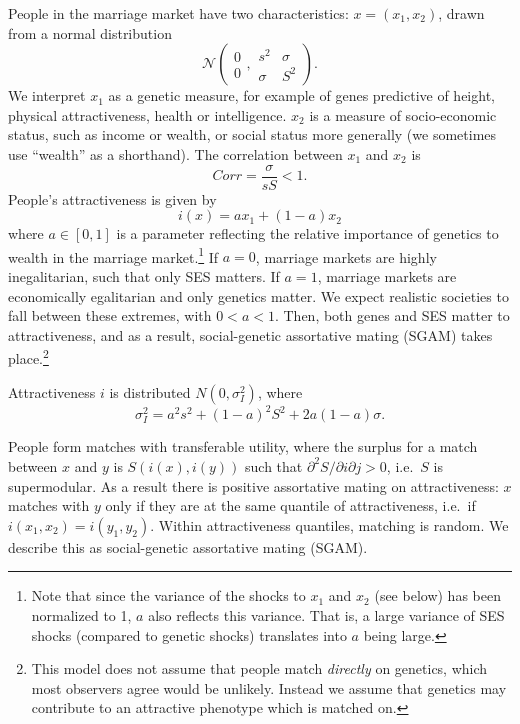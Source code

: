 \documentclass[
  12pt,
]{article}
\theoremstyle{definition}
\theoremstyle{definition}
\theoremstyle{definition}
\theoremstyle{definition}
\theoremstyle{remark}
\begin{document}
People in the marriage market have two characteristics:
\(x=\left( x_{1},x_{2}\right)\), drawn from a normal distribution
\[
\mathcal{N}
\left( 
\begin{array}{c}
0 \\ 
0%
\end{array}%
,%
\begin{array}{cc}
s^{2} & \sigma \\ 
\sigma & S^{2}%
\end{array}%
\right).
\]
We interpret \(x_1\) as a genetic measure, for example of genes predictive of
height, physical attractiveness, health or intelligence. \(x_2\) is a measure of
socio-economic status, such as income or wealth, or social status more generally
(we sometimes use ``wealth'' as a shorthand). The correlation between
\(x_1\) and \(x_2\) is
\[
Corr = \frac{\sigma }{sS} < 1.
\]
People's attractiveness is given by
\[
i\left( x\right) =ax_{1}+\left( 1-a\right) x_{2}
\]
where \(a \in [0, 1]\) is a parameter reflecting the relative importance of
genetics to wealth in the marriage market.\footnote{Note that since the variance of the shocks to \(x_1\) and \(x_2\)
  (see below) has been normalized to 1, \(a\) also reflects this variance. That
  is, a large variance of SES shocks (compared to genetic shocks) translates into
  \(a\) being large.} If \(a = 0\),
marriage markets are highly inegalitarian, such that only SES matters. If \(a = 1\), marriage markets are economically egalitarian and only genetics matter. We
expect realistic societies to fall between these extremes, with \(0 < a < 1\).
Then, both genes and SES matter to attractiveness, and as a result,
social-genetic assortative mating (SGAM) takes place.\footnote{This model does not assume that people match \emph{directly} on
  genetics, which most observers agree would be unlikely. Instead we assume that
  genetics may contribute to an attractive phenotype which is matched on.}

Attractiveness \(i\) is
distributed \(N(0,\sigma_{I}^{2})\), where
\[
\sigma _{I}^{2}=a^{2}s^{2}+\left( 1-a\right) ^{2}S^{2}+2a\left( 1-a\right)\sigma.
\]

People form matches with transferable utility, where the surplus for a match
between \(x\) and \(y\) is \(S(i(x), i(y))\) such that \(\partial^{2}S/\partial i\partial j > 0\), i.e.~\(S\) is supermodular. As a result there is positive
assortative mating on attractiveness: \(x\) matches with \(y\) only if they are at
the same quantile of attractiveness, i.e.~if \(i(x_{1},x_{2}) = i(y_{1},y_{2})\).
Within attractiveness quantiles, matching is random. We describe this as
social-genetic assortative mating (SGAM).
\end{document}
